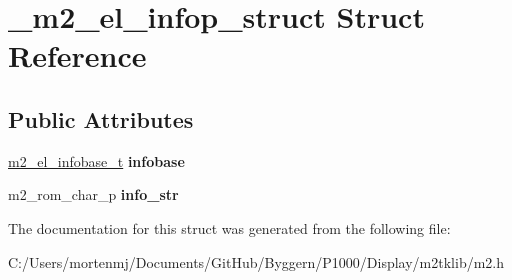 \hypertarget{struct__m2__el__infop__struct}{\section{\-\_\-m2\-\_\-el\-\_\-infop\-\_\-struct Struct Reference}
\label{struct__m2__el__infop__struct}
}
\subsection*{Public Attributes}
\begin{DoxyCompactItemize}
\item 
\hypertarget{struct__m2__el__infop__struct_a660d6094d474014ec9ec601f032a89d4}{\hyperlink{struct__m2__el__infobase__struct}{m2\-\_\-el\-\_\-infobase\-\_\-t} {\bfseries infobase}}\label{struct__m2__el__infop__struct_a660d6094d474014ec9ec601f032a89d4}

\item 
\hypertarget{struct__m2__el__infop__struct_a6be6d72b26516edb8b4ff22c665d417e}{m2\-\_\-rom\-\_\-char\-\_\-p {\bfseries info\-\_\-str}}\label{struct__m2__el__infop__struct_a6be6d72b26516edb8b4ff22c665d417e}

\end{DoxyCompactItemize}


The documentation for this struct was generated from the following file\-:\begin{DoxyCompactItemize}
\item 
C\-:/\-Users/mortenmj/\-Documents/\-Git\-Hub/\-Byggern/\-P1000/\-Display/m2tklib/m2.\-h\end{DoxyCompactItemize}
